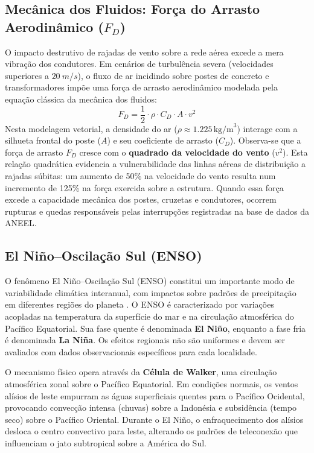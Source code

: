 \subsection{Mecânica dos Fluidos: Força do Arrasto Aerodinâmico \texorpdfstring{($F_D$)}{(FD)}}
O impacto destrutivo de rajadas de vento sobre a rede aérea excede a mera vibração dos condutores. Em cenários de turbulência severa (velocidades superiores a $20~m/s$), o fluxo de ar incidindo sobre postes de concreto e transformadores impõe uma força de arrasto aerodinâmico modelada pela equação clássica da mecânica dos fluidos:
\begin{equation}
    F_D = \frac{1}{2} \cdot \rho \cdot C_D \cdot A \cdot v^2
    \label{eq:forca_arrasto}
\end{equation}
Nesta modelagem vetorial, a densidade do ar ($\rho \approx 1.225 \, \text{kg/m}^3$) interage com a silhueta frontal do poste ($A$) e seu coeficiente de arrasto ($C_D$). Observa-se que a força de arrasto $F_D$ cresce com o \textbf{quadrado da velocidade do vento} ($v^2$). Esta relação quadrática evidencia a vulnerabilidade das linhas aéreas de distribuição a rajadas súbitas: um aumento de 50\% na velocidade do vento resulta num incremento de 125\% na força exercida sobre a estrutura. Quando essa força excede a capacidade mecânica dos postes, cruzetas e condutores, ocorrem rupturas e quedas responsáveis pelas interrupções registradas na base de dados da ANEEL.

\subsection{El Niño--Oscilação Sul (ENSO)}\label{sec:enso}

O fenômeno El Niño--Oscilação Sul (ENSO) constitui um importante modo de variabilidade climática interanual, com impactos sobre padrões de precipitação em diferentes regiões do planeta \cite{ropelewski1987global}. O ENSO é caracterizado por variações acopladas na temperatura da superfície do mar e na circulação atmosférica do Pacífico Equatorial. Sua fase quente é denominada \textbf{El Niño}, enquanto a fase fria é denominada \textbf{La Niña}. Os efeitos regionais não são uniformes e devem ser avaliados com dados observacionais específicos para cada localidade.

O mecanismo físico opera através da \textbf{Célula de Walker}, uma circulação atmosférica zonal sobre o Pacífico Equatorial. Em condições normais, os ventos alísios de leste empurram as águas superficiais quentes para o Pacífico Ocidental, provocando convecção intensa (chuvas) sobre a Indonésia e subsidência (tempo seco) sobre o Pacífico Oriental. Durante o El Niño, o enfraquecimento dos alísios desloca o centro convectivo para leste, alterando os padrões de teleconexão que influenciam o jato subtropical sobre a América do Sul.

